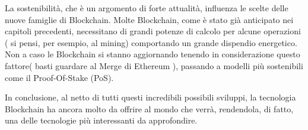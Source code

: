 La sostenibilità, che è un argomento di forte attualità, influenza le scelte delle nuove famiglie di Blockchain. Molte Blockchain, come è stato già anticipato nei capitoli precedenti, necessitano di grandi potenze di calcolo per alcune operazioni ( si pensi, per esempio, al mining) comportando un grande dispendio energetico. Non a caso le Blockchain si stanno aggiornando tenendo in considerazione questo fattore( basti guardare al Merge di Ethereum \cite{TheMerge}), passando a modelli più sostenibili come il Proof-Of-Stake (PoS).



In conclusione, al netto di tutti questi incredibili possibili sviluppi, la tecnologia Blockchain ha ancora molto da offrire al mondo che verrà, rendendola, di fatto, una delle tecnologie più interessanti da approfondire.